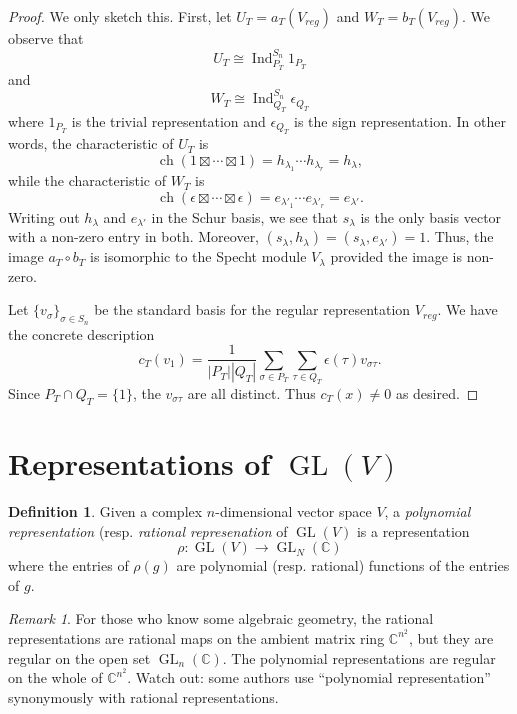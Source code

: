 \documentclass[12pt]{article}
\theoremstyle{plain}
\theoremstyle{definition}
\newtheorem{definition}[theorem]{Definition}
\theoremstyle{remark}
\newtheorem{remark}[theorem]{Remark}
\numberwithin{equation}{section}
\begin{document}
\begin{proof}
We only sketch this.
First, let $U_T = a_T(V_{reg})$ and $W_T = b_T(V_{reg})$.
We observe that
\[
U_T \cong \operatorname{Ind}_{P_T}^{S_n} 1_{P_T}
\]
and
\[
W_T \cong \operatorname{Ind}_{Q_T}^{S_n} \epsilon_{Q_T}
\]
where $1_{P_T}$ is the trivial representation and $\epsilon_{Q_T}$ is the sign
representation.
In other words, the characteristic of $U_T$ is
\[
\operatorname{ch}(1 \boxtimes \cdots \boxtimes 1)
= h_{\lambda_1} \cdots h_{\lambda_r} = h_\lambda,
\]
while the characteristic of $W_T$ is
\[
\operatorname{ch}(\epsilon \boxtimes \cdots \boxtimes \epsilon)
= e_{\lambda'_1} \cdots e_{\lambda'_r} = e_{\lambda'}.
\]
Writing out $h_\lambda$ and $e_{\lambda'}$ in the Schur basis,
we see that $s_\lambda$ is the only basis vector with a non-zero entry
in both.
Moreover, $(s_\lambda,h_\lambda)=(s_\lambda,e_{\lambda'})=1$.
Thus, the image $a_T \circ b_T$ is isomorphic to the Specht module
$V_\lambda$ provided the image is non-zero.

Let $\{ v_\sigma \}_{\sigma \in S_n}$ be the standard basis for the regular
representation $V_{reg}$.
We have the concrete description
\[
c_T(v_{1})  = \frac{1}{|P_T| |Q_T|}\sum_{\sigma \in P_T}\sum_{\tau \in Q_T}
\epsilon(\tau) v_{\sigma\tau} .
\]
Since $P_T \cap Q_T = \{1\}$, the $v_{\sigma\tau}$ are all distinct.
Thus $c_T(x) \ne 0$ as desired.
\end{proof}

\section{Representations of $\operatorname{GL}(V)$}

\begin{definition}
Given a complex $n$-dimensional vector space $V$,
a \emph{polynomial representation} (resp. \emph{rational represenation} of
$\operatorname{GL}(V)$ is a representation
\[
\rho : \operatorname{GL}(V) \to \operatorname{GL}_N(\mathbb{C})
\]
where the entries of $\rho(g)$ are polynomial (resp. rational)
functions of the entries of $g$.
\end{definition}

\begin{remark}
For those who know some algebraic geometry,
the rational representations are rational maps on the ambient matrix
ring $\mathbb{C}^{n^2}$, but they are regular on the open set
$\operatorname{GL}_n(\mathbb{C})$.
The polynomial representations are regular on the whole of
$\mathbb{C}^{n^2}$.
Watch out: some authors use ``polynomial representation'' synonymously with
rational representations.
\end{remark}
\end{document}
